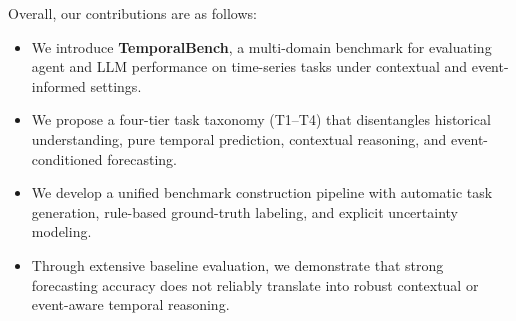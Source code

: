 Overall, our contributions are as follows:
\begin{itemize}
\item We introduce \textbf{TemporalBench}, a multi-domain benchmark for evaluating agent and LLM performance on time-series tasks under contextual and event-informed settings.
\item We propose a four-tier task taxonomy (T1--T4) that disentangles historical understanding, pure temporal prediction, contextual reasoning, and event-conditioned forecasting.
\item We develop a unified benchmark construction pipeline with automatic task generation, rule-based ground-truth labeling, and explicit uncertainty modeling.
\item Through extensive baseline evaluation, we demonstrate that strong forecasting accuracy does not reliably translate into robust contextual or event-aware temporal reasoning.
\end{itemize}
